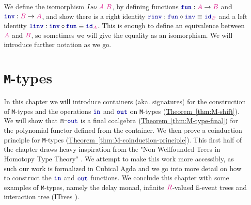 \documentclass[twoside,11pt,openright]{report}
\theoremstyle{plain} %
\theoremstyle{definition}
\theoremstyle{remark}
\newcommand*{\thmref}[1]{\hyperref[thm:#1]{Theorem~\ref*{thm:#1}}} %
\newcommand*{\type}[1]{\textcolor{magenta!90!black}{#1}}
\newcommand*{\coalg}[2]{#1\texttt{-}#2}
\newcommand*{\function}[1]{\textcolor{blue!60!black}{\ensuremath{\mathtt{#1}}}}
\newcommand*{\typeformer}[1]{\ensuremath{\mathtt{#1}}}
\begin{document}
\noindent We define the isomorphism \(Iso~\type{A}~\type{B}\), by defining functions \(\function{fun} : \type{A} \rightarrow \type{B}\) and \(\function{inv} : \type{B} \rightarrow \type{A}\), and show there is a right identity \(\function{rinv} : \function{fun} \circ \function{inv} \equiv \function{id}_{\type{B}}\) and a left identity \(\function{linv} : \function{inv} \circ \function{fun} \equiv \function{id}_{\type{A}}\). This is enough to define an equivalence between \(\type{A}\) and \(\type{B}\), so sometimes we will give the equality as an isomorphism. We will introduce further notation as we go.


\chapter{\texttt{M}-types}
\label{ch:M-types}
In this chapter we will introduce containers (aka. signatures) for the construction of \texttt{M}-types and the operations \(\function{in}\) and \(\function{out}\) on \texttt{M}-types (\thmref{M-shift}). We will show that \(\coalg{\typeformer{M}}{\function{out}}\) is a final coalgebra (\thmref{M-type-final}) for the polynomial functor defined from the container. We then prove a coinduction principle for \texttt{M}-types (\thmref{M-coinduction-principle}). This first half of the chapter draws heavy inspiration from the "Non-Wellfounded Trees in Homotopy Type Theory" \cite{DBLP:non-wellfounded}. We attempt to make this work more accessibly, as such our work is formalized in Cubical Agda and we go into more detail on how to construct the \(\function{in}\) and \(\function{out}\) functions. We conclude this chapter with some examples of \texttt{M}-types, namely the delay monad, infinite \(\type{R}\)-valued \(\typeformer{E}\)-event trees and interaction tree (ITrees \cite{DBLP:itrees}).
\end{document}
